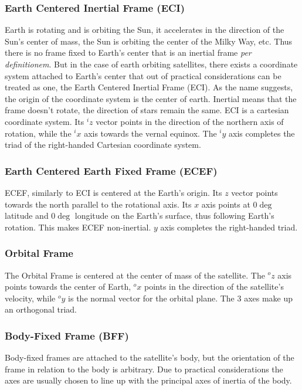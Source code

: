 \subsubsection{Earth Centered Inertial Frame (ECI)}
Earth is rotating and is orbiting the Sun, it accelerates in the direction of the Sun's center of mass, the Sun is orbiting the center of the Milky Way, etc. Thus there is no frame fixed to Earth's center that is an inertial frame \textit{per definitionem}. But in the case of earth orbiting satellites, there exists a coordinate system attached to Earth's center that out of practical considerations can be treated as one, the Earth Centered Inertial Frame (ECI).
As the name suggests, the origin of the coordinate system is the center of earth. Inertial means that the frame doesn't rotate, the direction of stars remain the same. 
ECI is a cartesian coordinate system. Its $^iz$ vector points in the direction of the northern axis of rotation, while the $^ix$ axis towards the vernal equinox. The $^iy$ axis completes the triad of the right-handed Cartesian coordinate system.




\subsubsection{Earth Centered Earth Fixed Frame (ECEF)}

ECEF, similarly to ECI is centered at the Earth's origin. Its $z$ vector points towards the north parallel to the rotational axis. Its $x$ axis points at $0\deg$ latitude and $0\deg$ longitude on the Earth's surface, thus following Earth's rotation. This makes ECEF non-inertial. $y$ axis completes the right-handed triad.

\subsubsection{Orbital Frame}

The Orbital Frame is centered at the center of mass of the satellite. The $^oz$ axis points towards the center of Earth, $^ox$ points in the direction of the satellite's velocity, while $^oy$ is the normal vector for the orbital plane. The 3 axes make up an orthogonal triad.


\subsubsection{Body-Fixed Frame (BFF)}

Body-fixed frames are attached to the satellite's body, but the orientation of the frame in relation to the body is arbitrary. Due to practical considerations the axes are usually chosen to line up with the principal axes of inertia of the body.

